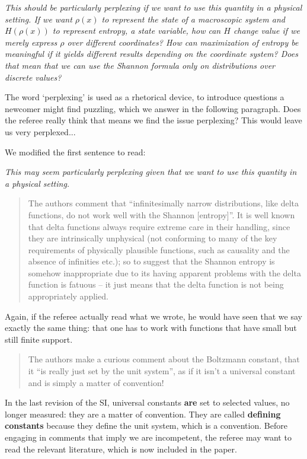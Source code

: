\documentclass[11pt]{article}
\begin{document}
\emph{	This should be particularly perplexing if we want to use this quantity in a physical setting. If we want $\rho(x)$ to represent the state of a macroscopic system and $H(\rho(x))$ to represent entropy, a state variable, how can $H$ change value if we merely express $\rho$ over different coordinates? How can maximization of entropy be meaningful if it yields different results depending on the coordinate system? Does that mean that we can use the Shannon formula only on distributions over discrete values?}

The word `perplexing' is used as a rhetorical device, to introduce questions a newcomer might find puzzling, which we answer in the following paragraph. Does the referee really think that means we find the issue perplexing? This would leave us very perplexed...

We modified the first sentence to read:

\emph{This may seem particularly perplexing given that we want to use this quantity in a physical setting.}

\begin{quote}
The authors comment that “infinitesimally narrow distributions, like delta functions, do not work well with the Shannon [entropy]”. It is well known that delta functions always require extreme care in their handling, since they are intrinsically unphysical (not conforming to many of the key requirements of physically plausible functions, such as causality and the absence of infinities etc.); so to suggest that the Shannon entropy is somehow inappropriate due to its having apparent problems with the delta function is fatuous – it just means that the delta function is not being appropriately applied. 
\end{quote}
Again, if the referee actually read what we wrote, he would have seen that we say exactly the same thing: that one has to work with functions that have small but still finite support.

\begin{quote}
The authors make a curious comment about the Boltzmann constant, that it “is really just set by the unit system”, as if it isn’t a universal constant and is simply a matter of convention! 
\end{quote}
In the last revision of the SI, universal constants \textbf{are} set to selected values, no longer measured: they are a matter of convention. They are called \textbf{defining constants} because they define the unit system, which is a convention. Before engaging in comments that imply we are incompetent, the referee may want to read the relevant literature, which is now included in the paper.
\end{document}
